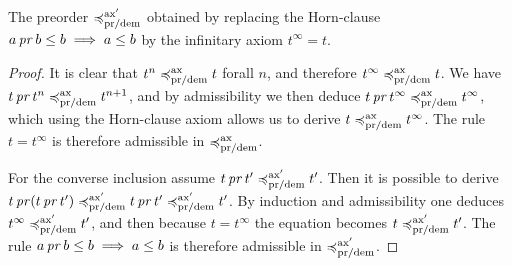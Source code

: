 \begin{proposition}
    The preorder $\preccurlyeq^{\text{ax}'}_{\text{pr/dem}}$ obtained 
    by replacing the Horn-clause $a \operatorname{\mathit{pr}} b \leq b \implies a \leq b$ by 
    the infinitary axiom $t^\infty = t$.
\end{proposition}

\begin{proof}
    It is clear that $t^n \preccurlyeq^{\text{ax}}_{\text{pr/dem}} t$ forall $n$,
    and therefore $t^\infty \preccurlyeq^{\text{ax}}_{\text{pr/dem}} t$. 
    We have $t \operatorname{\mathit{pr}} t^n \preccurlyeq^{\text{ax}}_{\text{pr/dem}} t^{n+1}$,
    and by admissibility we then deduce $t \operatorname{\mathit{pr}} t^\infty \preccurlyeq^{\text{ax}}_{\text{pr/dem}}
    t^\infty$, which using the Horn-clause axiom allows us to derive $t
    \preccurlyeq^{\text{ax}}_{\text{pr/dem}} t^\infty$. The rule $t = t^\infty$ is therefore admissible
    in $\preccurlyeq^{\text{ax}}_{\text{pr/dem}}$.

    For the converse inclusion assume $t \operatorname{\mathit{pr}} t' \preccurlyeq^{\text{ax}'}_{\text{pr/dem}} t'$.
    Then it is possible to derive $t \operatorname{\mathit{pr}} (t \operatorname{\mathit{pr}} t') \preccurlyeq^{\text{ax}'}_{\text{pr/dem}} t \operatorname{\mathit{pr}} t' \preccurlyeq^{\text{ax}'}_{\text{pr/dem}} t'$.
    By induction and admissibility one deduces $t^\infty \preccurlyeq^{\text{ax}'}_{\text{pr/dem}} t'$,
    and then because $t = t^\infty$ the equation becomes $t
    \preccurlyeq^{\text{ax}'}_{\text{pr/dem}} t'$. The rule $a \operatorname{\mathit{pr}} b \leq b \implies a \leq b$
    is therefore admissible in $\preccurlyeq^{\text{ax}'}_{\text{pr/dem}}$.
\end{proof}
